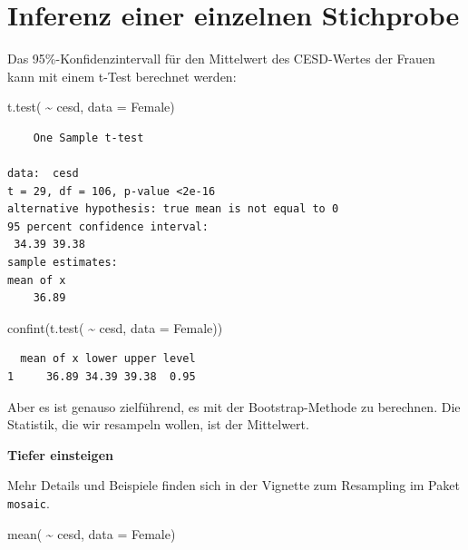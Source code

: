 \documentclass[
  ngerman,
]{scrbook}
\newenvironment{Shaded}{\begin{snugshade}}{\end{snugshade}}
\newcommand{\AttributeTok}[1]{\textcolor[rgb]{0.77,0.63,0.00}{#1}}
\newcommand{\FunctionTok}[1]{\textcolor[rgb]{0.00,0.00,0.00}{#1}}
\newcommand{\NormalTok}[1]{#1}
\newcommand{\SpecialCharTok}[1]{\textcolor[rgb]{0.00,0.00,0.00}{#1}}
\newenvironment{tiefereinsteigen}[1]
  {
  \begin{itemize}
  \renewcommand{\labelitemi}{
    \raisebox{2.6\height}[0pt][0pt]{
      {\setkeys{Gin}{width=7em,keepaspectratio}
        {\normalsize \textcolor{dark-fom-green}\faSearch}}
        }
  }
  \begin{blackbox}
         \bgroup\color{dark-fom-green}
          {\textbf{Tiefer einsteigen}}
        \egroup
  \item
  }
  {
  \end{blackbox}
  \end{itemize}
  }
\begin{document}
\hypertarget{bootstrap}{%
\section{Inferenz einer einzelnen Stichprobe}\label{bootstrap}}

Das 95\%-Konfidenzintervall für den Mittelwert des CESD-Wertes der Frauen kann mit einem t-Test berechnet werden:

\begin{Shaded}
\begin{Highlighting}[]
\FunctionTok{t.test}\NormalTok{( }\SpecialCharTok{\textasciitilde{}}\NormalTok{ cesd, }\AttributeTok{data =}\NormalTok{ Female)}
\end{Highlighting}
\end{Shaded}

\begin{verbatim}
    One Sample t-test

data:  cesd
t = 29, df = 106, p-value <2e-16
alternative hypothesis: true mean is not equal to 0
95 percent confidence interval:
 34.39 39.38
sample estimates:
mean of x 
    36.89 
\end{verbatim}

\begin{Shaded}
\begin{Highlighting}[]
\FunctionTok{confint}\NormalTok{(}\FunctionTok{t.test}\NormalTok{( }\SpecialCharTok{\textasciitilde{}}\NormalTok{ cesd, }\AttributeTok{data =}\NormalTok{ Female))}
\end{Highlighting}
\end{Shaded}

\begin{verbatim}
  mean of x lower upper level
1     36.89 34.39 39.38  0.95
\end{verbatim}

Aber es ist genauso zielführend, es mit der Bootstrap-Methode zu berechnen. Die Statistik, die wir resampeln wollen, ist der Mittelwert.

\begin{tiefereinsteigen}{tiefereinsteigen}
Mehr Details und Beispiele finden sich in der Vignette zum Resampling im Paket \texttt{mosaic}.

\end{tiefereinsteigen}

\begin{Shaded}
\begin{Highlighting}[]
\FunctionTok{mean}\NormalTok{( }\SpecialCharTok{\textasciitilde{}}\NormalTok{ cesd, }\AttributeTok{data =}\NormalTok{ Female)}
\end{Highlighting}
\end{Shaded}
\end{document}
